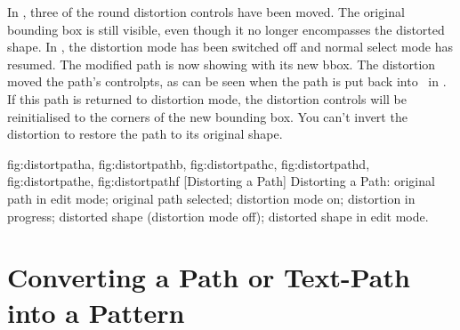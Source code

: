 In , three of the round distortion
controls have been moved. The original bounding box is still
visible, even though it no longer encompasses the distorted shape.
In , the distortion mode has been
switched off and normal select mode has resumed. The modified path
is now showing with its new \gls{bbox}. The distortion moved the
path's \glspl{controlpt}, as can be seen when the path is put back into
\editpathmode\ in . If this path is
returned to distortion mode, the distortion controls will be reinitialised to
the corners of the new bounding box. You can't invert the distortion
to restore the path to its original shape.

{
  {fig:distortpatha}{}{},
  {fig:distortpathb}{}{},
  {fig:distortpathc}{}{},
  {fig:distortpathd}{}{},
  {fig:distortpathe}{}{},
  {fig:distortpathf}{}{}
}
[Distorting a Path]
{Distorting a Path: 
 original path in edit mode;
 original path selected;
 distortion mode on;
 distortion in progress;
 distorted shape (distortion mode off);
 distorted shape in edit mode.}

\section{Converting a Path or Text-Path into a Pattern}\label{sec:patterns}

